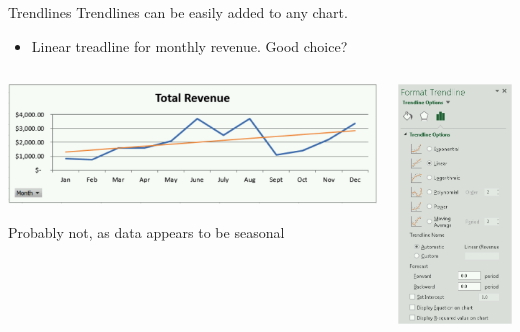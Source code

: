 \documentclass[xcolor=svgnames]{beamer}
\begin{document}
\begin{frame}{Trendlines}
Trendlines can be easily added to any chart.
\begin{itemize}
\item Linear treadline for monthly revenue.  Good choice?
\end{itemize}
\begin{columns}[T] %
\begin{column}{.48\textwidth}
\vspace{5mm}
 \begin{center}
 \hspace*{6mm}                                                           
    \includegraphics[width=1.3\textwidth]{Trendlines1}
 \end{center}
  \begin{alertblock}{}
Probably not, as data appears to be seasonal  \end{alertblock}
\end{column}%
\hfill%
\begin{column}{.48\textwidth}
\vspace{-5mm}
 \begin{center}
        \includegraphics[height=.7\textheight]{Trendlines2}

\end{center}
\end{column}
\end{columns}
\end{frame}
\end{document}

